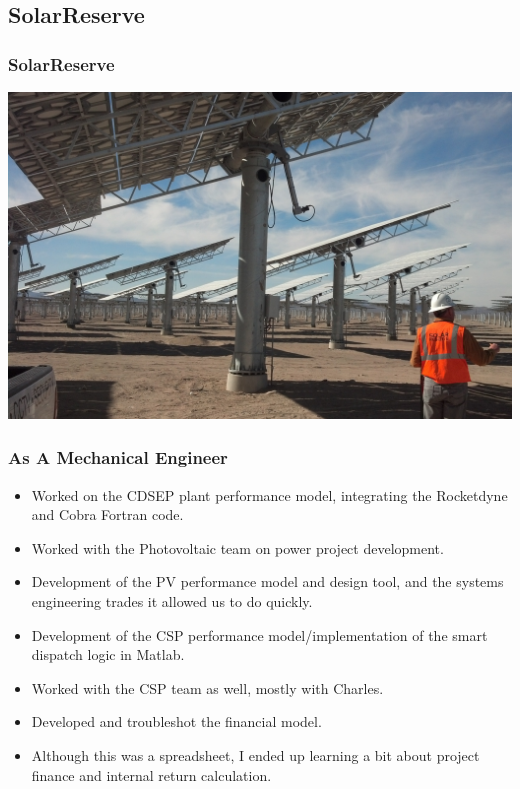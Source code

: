 \documentclass[aspectratio=169]{beamer}
\begin{document}


\subsection{SolarReserve}

\begin{frame}
  \frametitle{SolarReserve}
  \center
  \includegraphics[width=.7\linewidth]{HeliostatImage.jpg}
\end{frame}


\begin{frame}
  \frametitle{As A Mechanical Engineer}
  \begin{itemize}
  \item Worked on the CDSEP plant performance model, integrating the Rocketdyne and Cobra Fortran code.
  \item Worked with the Photovoltaic team on power project development.
  \item Development of the PV performance model and design tool, and the systems engineering trades it allowed us to do quickly.
  \item Development of the CSP performance model/implementation of the smart dispatch logic in Matlab.
  \item Worked with the CSP team as well, mostly with Charles.
  \item Developed and troubleshot the financial model.
  \item Although this was a spreadsheet, I ended up learning a bit about project finance and internal return calculation.
  \end{itemize}
\end{frame}
\end{document}
